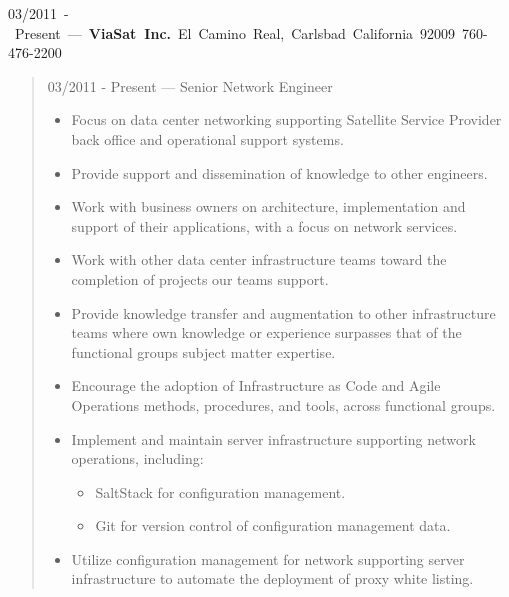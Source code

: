 \mbox{03/2011 - Present --- {\bf ViaSat Inc.} El Camino Real, Carlsbad California 92009 760-476-2200}
\begin{quote}
03/2011 - Present --- Senior Network Engineer\\
\begin{itemize}
\item Focus on data center networking supporting Satellite Service Provider
back office and operational support systems.
\item Provide support and dissemination of knowledge to other engineers.
\item Work with business owners on architecture, implementation and support of
their applications, with a focus on network services.
\item Work with other data center infrastructure teams toward the completion of
projects our teams support.
\item Provide knowledge transfer and augmentation to other infrastructure teams
where own knowledge or experience surpasses that of the functional groups
subject matter expertise.
\item Encourage the adoption of Infrastructure as Code and Agile Operations
methods, procedures, and tools, across functional groups.
\item Implement and maintain server infrastructure supporting network
operations, including:
\begin{itemize}
\item SaltStack for configuration management.
\item Git for version control of configuration management data.
\end{itemize}
\item Utilize configuration management for network supporting server
infrastructure to automate the deployment of proxy white listing.
\end{itemize}
\end{quote}
